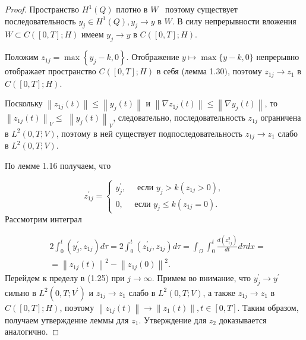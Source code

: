\begin{proof}
    Пространство $H^{1}(Q)$ плотно в $W$~\cite[423]{Zeidler1990a} поэтому
    существует последовательность $y_{j} \in H^{1}(Q), y_{j} \rightarrow y$ в $W$.
    В силу непрерывности вложения $W \subset C([0, T] ; H)$
    имеем $y_{j} \rightarrow y$ в $C([0, T] ; H)$.

    Положим $z_{1 j}=\max \left\{y_{j}-k, 0\right\}$.
    Отображение $y \mapsto \max \{y-k, 0\}$ непрерывно отображает
    пространство $C([0, T] ; H)$ в себя (лемма 1.30$)$, поэтому
    $z_{1 j} \rightarrow z_{1}$ в $C([0, T] ; H)$.

    Поскольку $\left\|z_{1 j}(t)\right\| \leq\left\|y_{j}(t)\right\|$
    и $\left\|\nabla z_{1 j}(t)\right\| \leq\left\|\nabla y_{j}(t)\right\|$,
    то $\left\|z_{1 j}(t)\right\|_{V} \leq$ $\left\|y_{j}(t)\right\|_{V}$,
    следовательно, последовательность $z_{1 j}$ ограничена в $L^{2}(0, T ; V)$,
    поэтому в ней существует подпоследовательность
    $z_{1 j} \rightarrow z_{1}$ слабо в $L^{2}(0, T ; V)$.

    По лемме 1.16 получаем, что

    \[
        z_{1 j}^{\prime}=
        \left\{\begin{array}{l}
                   y_{j}^{\prime}, \quad \text { если }
                   y_{j}>k\left(z_{1 j}>0\right), \\
                   0, \quad \text { если }
                   y_{j} \leq k\left(z_{1 j}=0\right).
        \end{array}\right.
    \]
    Рассмотрим интеграл

    \[
        \begin{aligned}
            & 2 \int_{0}^{t}\left(y_{j}^{\prime}, z_{1 j}\right) d \tau=
            2 \int_{0}^{t}\left(z_{1 j}^{\prime}, z_{1 j}\right) d \tau=
            \int_{\Omega} \int_{0}^{t}
            \frac{d\left(z_{1 j}^{2}\right)}{d t} d \tau d x= \\
            &=\left\|z_{1 j}(t)\right\|^{2}-\left\|z_{1 j}(0)\right\|^{2}.
        \end{aligned}
    \]
    Перейдем к пределу в (1.25) при $j \rightarrow \infty$.
    Примем во внимание, что $y_{j}^{\prime} \rightarrow y^{\prime}$
    сильно в $L^{2}\left(0, T ; V^{\prime}\right)$ и
    $z_{1 j} \rightarrow z_{1}$ слабо в $L^{2}(0, T ; V)$,
    а также $z_{1 j} \rightarrow z_{1}$ в $C([0, T] ; H)$,
    поэтому $\left\|z_{1 j}(t)\right\| \rightarrow\left\|z_{1}(t)\right\|, t \in[0, T]$.
    Таким образом, получаем утверждение леммы для $z_{1}$.
    Утверждение для $z_{2}$ доказывается аналогично.
\end{proof}

